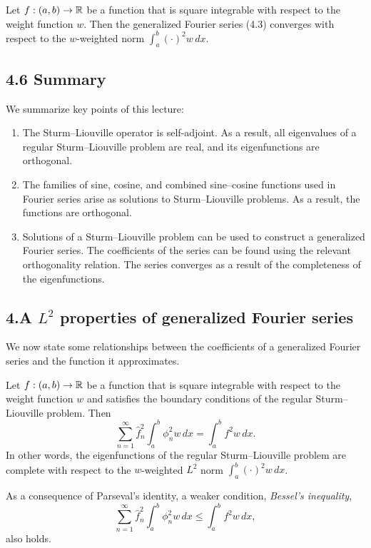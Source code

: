 \begin{theorem}
    Let $f : (a, b) \to \mathbb{R}$ be a function that is square integrable with respect to the weight function $w$. Then the generalized Fourier series (4.3) converges with respect to the $w$-weighted norm $\int_a^b (\cdot)^2 w\,dx$.
\end{theorem}

\subsection{4.6 Summary}
We summarize key points of this lecture:
\begin{enumerate}
    \item The Sturm--Liouville operator is self-adjoint. As a result, all eigenvalues of a regular Sturm--Liouville problem are real, and its eigenfunctions are orthogonal.
    \item The families of sine, cosine, and combined sine--cosine functions used in Fourier series arise as solutions to Sturm--Liouville problems. As a result, the functions are orthogonal.
    \item Solutions of a Sturm--Liouville problem can be used to construct a generalized Fourier series. The coefficients of the series can be found using the relevant orthogonality relation. The series converges as a result of the completeness of the eigenfunctions.
\end{enumerate}

\subsection{4.A $L^2$ properties of generalized Fourier series}
We now state some relationships between the coefficients of a generalized Fourier series and the function it approximates.

\begin{theorem}
    Let $f : (a, b) \to \mathbb{R}$ be a function that is square integrable with respect to the weight function $w$ and satisfies the boundary conditions of the regular Sturm--Liouville problem. Then
    \[\sum_{n=1}^{\infty} \hat{f}_n^2 \int_a^b \phi_n^2 w\,dx = \int_a^b f^2 w\,dx.\]
    In other words, the eigenfunctions of the regular Sturm--Liouville problem are complete with respect to the $w$-weighted $L^2$ norm $\int_a^b (\cdot)^2 w\,dx$.
\end{theorem}

\begin{corollary}
    As a consequence of Parseval's identity, a weaker condition, \textit{Bessel's inequality},
    \[\sum_{n=1}^{\infty} \hat{f}_n^2 \int_a^b \phi_n^2 w\,dx \leq \int_a^b f^2 w\,dx,\]
    also holds.
\end{corollary}
